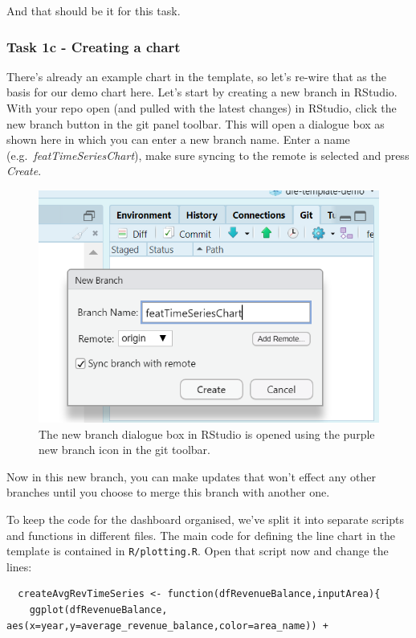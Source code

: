 \documentclass[
  12pt,
]{article}
\begin{document}
And that should be it for this task.

\hypertarget{task-1c---creating-a-chart}{%
\subsubsection{Task 1c - Creating a
chart}\label{task-1c---creating-a-chart}}

There's already an example chart in the template, so let's re-wire that
as the basis for our demo chart here. Let's start by creating a new
branch in RStudio. With your repo open (and pulled with the latest
changes) in RStudio, click the new branch button in the git panel
toolbar. This will open a dialogue box as shown here in which you can
enter a new branch name. Enter a name (e.g.~\emph{featTimeSeriesChart}),
make sure syncing to the remote is selected and press \emph{Create}.

\begin{figure}

{\centering \includegraphics[width=0.64\linewidth]{images/gitdemo/gitdemo-RStudio_NewBranch} 

}

\caption{The new branch dialogue box in RStudio is opened using the purple new branch icon in the git toolbar.}\label{fig:unnamed-chunk-12}
\end{figure}

Now in this new branch, you can make updates that won't effect any other
branches until you choose to merge this branch with another one.

To keep the code for the dashboard organised, we've split it into
separate scripts and functions in different files. The main code for
defining the line chart in the template is contained in
\texttt{R/plotting.R}. Open that script now and change the lines:

\begin{verbatim}
  createAvgRevTimeSeries <- function(dfRevenueBalance,inputArea){
    ggplot(dfRevenueBalance, aes(x=year,y=average_revenue_balance,color=area_name)) + 
\end{verbatim}
\end{document}
